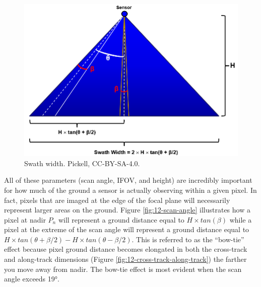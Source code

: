 \documentclass[
]{book}
\begin{document}
\begin{figure}
\includegraphics[width=1\linewidth]{images/12-swath-width} \caption{Swath width. Pickell, CC-BY-SA-4.0.}\label{fig:12-swath-width}
\end{figure}

All of these parameters (scan angle, IFOV, and height) are incredibly important for how much of the ground a sensor is actually observing within a given pixel. In fact, pixels that are imaged at the edge of the focal plane will necessarily represent larger areas on the ground. Figure \ref{fig:12-scan-angle} illustrates how a pixel at nadir \(P_n\) will represent a ground distance equal to \(H × tan(β)\) while a pixel at the extreme of the scan angle will represent a ground distance equal to \(H × tan(θ + β/2) - H × tan(θ - β/2)\). This is referred to as the ``bow-tie'' effect because pixel ground distance becomes elongated in both the cross-track and along-track dimensions (Figure \ref{fig:12-cross-track-along-track}) the farther you move away from nadir. The bow-tie effect is most evident when the scan angle exceeds 19°.
\end{document}
